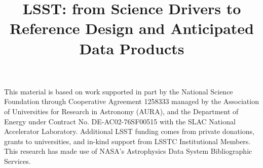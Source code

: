 \documentclass[twocolumn]{aastex62}
\begin{document}
\title{LSST: from Science Drivers to Reference Design and Anticipated Data Products}













\acknowledgments
This material is based on work supported in part by the National Science Foundation
through Cooperative Agreement 1258333 managed by the Association of Universities for
Research in Astronomy (AURA), and the Department of Energy under Contract No.
DE-AC02-76SF00515 with the SLAC National Accelerator Laboratory. Additional LSST
funding comes from private donations, grants to universities, and in-kind support from
LSSTC Institutional Members.
This research has made use of NASA's Astrophysics Data System Bibliographic Services.





\listofchanges
\end{document}
